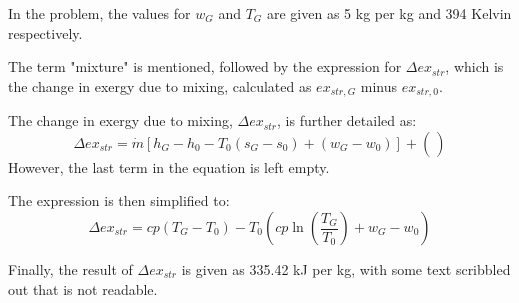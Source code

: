 In the problem, the values for \( w_G \) and \( T_G \) are given as 5 kg per kg and 394 Kelvin respectively.

The term "mixture" is mentioned, followed by the expression for \( \Delta ex_{str} \), which is the change in exergy due to mixing, calculated as \( ex_{str,G} \) minus \( ex_{str,0} \).

The change in exergy due to mixing, \( \Delta ex_{str} \), is further detailed as:
\[ 
\Delta ex_{str} = \dot{m} \left[ h_G - h_0 - T_0 (s_G - s_0) + (w_G - w_0) \right] + \left( \frac{}{} \right)
\]
However, the last term in the equation is left empty.

The expression is then simplified to:
\[ 
\Delta ex_{str} = cp (T_G - T_0) - T_0 \left( cp \ln \left( \frac{T_G}{T_0} \right) + w_G - w_0 \right)
\]

Finally, the result of \( \Delta ex_{str} \) is given as 335.42 kJ per kg, with some text scribbled out that is not readable.